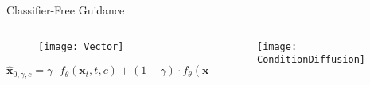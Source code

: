 
\begin{frame}{Classifier-Free Guidance}
%	

	

	\begin{columns}
		\begin{column}{0.55\textwidth}
			\begin{figure}
				\centering
				\texttt{[image: Vector]}
			\end{figure}
		
		\begin{equation*}
			\hat{\mathbf{x}}_{0, \gamma, c} = \gamma \cdot f_{\theta} (\mathbf{x}_t, t, c) + (1-\gamma) \cdot f_{\theta} (\mathbf{x}_t, t, c_\varnothing)
		\end{equation*}
		
		\vspace{-15pt}
		
	
			
		\end{column}
		
		\begin{column}{0.45\textwidth}
				\begin{figure}
				\centering
				\texttt{[image: ConditionDiffusion]}
			\end{figure}
		\end{column}
	\end{columns}
	
\end{frame}





